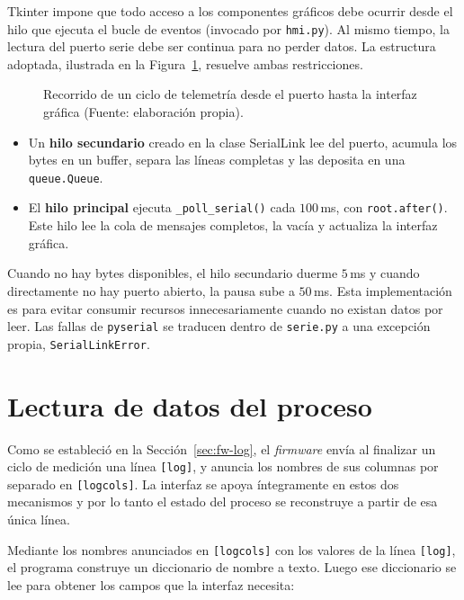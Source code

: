 Tkinter impone que todo acceso a los componentes gráficos debe ocurrir desde el hilo que ejecuta el bucle de eventos (invocado por \texttt{hmi.py}). Al mismo tiempo, la lectura del puerto serie debe ser continua para no perder datos. La estructura adoptada, ilustrada en la Figura~\ref{fig:hmi-datos}, resuelve ambas restricciones.

\begin{figure}[htbp]
\centering
\resizebox{0.85\textwidth}{!}{}
\caption[Diagrama de flujo de un ciclo de \textit{log}]%
{Recorrido de un ciclo de telemetría desde el puerto hasta la interfaz gráfica (Fuente: elaboración propia).}
\label{fig:hmi-datos}
\end{figure}

\begin{itemize}
\item Un \textbf{hilo secundario} creado en la clase SerialLink lee del puerto, acumula los bytes en un buffer, separa las líneas completas y las deposita en una \texttt{queue.Queue}.
\item El \textbf{hilo principal} ejecuta \texttt{\_poll\_serial()} cada $100$\,ms, con \texttt{root.after()}. Este hilo lee la cola de mensajes completos, la vacía y actualiza la interfaz gráfica.
\end{itemize}


Cuando no hay bytes disponibles, el hilo secundario duerme $5$\,ms y cuando directamente no hay puerto abierto, la pausa sube a $50$\,ms. Esta implementación es para evitar consumir recursos innecesariamente cuando no existan datos por leer. Las fallas de \texttt{pyserial} se traducen dentro de \texttt{serie.py} a una excepción propia, \texttt{SerialLinkError}.

\section{Lectura de datos del proceso}
\label{sec:hmi-telemetria}

Como se estableció en la Sección~\ref{sec:fw-log}, el \emph{firmware} envía al finalizar un ciclo de medición una línea \texttt{[log]}, y anuncia los nombres de sus columnas por separado en \texttt{[logcols]}. La interfaz se apoya íntegramente en estos dos mecanismos y por lo tanto el estado del proceso se reconstruye a partir de esa única línea.

Mediante los nombres anunciados en \texttt{[logcols]} con los valores de la línea \texttt{[log]}, el programa construye un diccionario de nombre a texto. Luego ese diccionario se lee para obtener los campos que la interfaz necesita:


